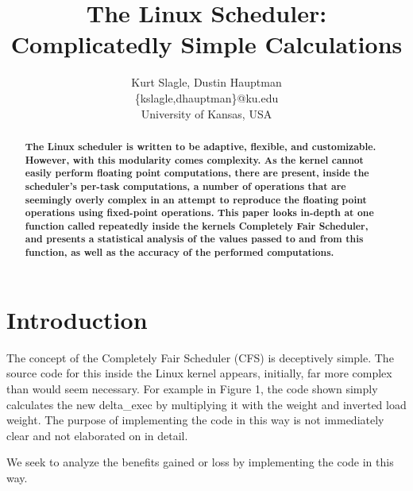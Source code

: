 \documentclass[10pt, conference]{IEEEtran}
\begin{document}
\title{The Linux Scheduler: Complicatedly Simple Calculations}
\author{Kurt Slagle, Dustin Hauptman\\
\{kslagle,dhauptman\}@ku.edu\\
University of Kansas, USA\\ 
}

\maketitle
\thispagestyle{empty}
\begin{abstract}

\textbf{The Linux scheduler is written to be adaptive, flexible, and customizable.  However, with this modularity comes complexity.  As the kernel cannot easily perform floating point computations, there are present, inside the scheduler's per-task computations, a number of operations that are seemingly overly complex in an attempt to reproduce the floating point operations using fixed-point operations.  This paper looks in-depth at one function called repeatedly inside the kernels Completely Fair Scheduler, and presents a statistical analysis of the values passed to and from this function, as well as the accuracy of the performed computations.}

\end{abstract}


\section{Introduction}

The concept of the Completely Fair Scheduler (CFS) is deceptively simple.  The source code for this inside the Linux kernel appears, initially, far more complex than would seem necessary. For example in Figure 1, the code shown simply calculates the new delta\_exec by multiplying it with the weight and inverted load weight. The purpose of implementing the code in this way is not immediately clear and not elaborated on in detail.

We seek to analyze the benefits gained or loss by implementing the code in this way.
\end{document}
